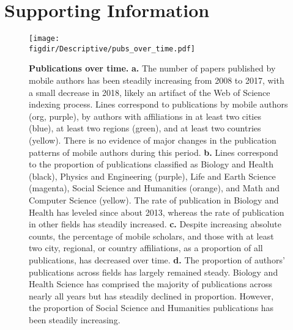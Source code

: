 \documentclass[12pt]{article} %
\def\figdir{../Figs}
\newcommand{\beginsupplement}{%
        \setcounter{table}{0}
        \renewcommand{\thetable}{S\arabic{table}}%
        \setcounter{figure}{0}
        \renewcommand{\thefigure}{S\arabic{figure}}%
     }
\begin{document}
\newpage
\clearpage
\beginsupplement
\section{Supporting Information}



%
%
\begin{figure}[p!]
    \centering
    \label{fig:supp:pubs_over_time}
    \texttt{[image: \\figdir/Descriptive/pubs\_over\_time.pdf]}
    \caption{
        \textbf{Publications over time.}
        \textbf{a.}
        The number of papers published by mobile authors has been steadily increasing from 2008 to 2017, with a small decrease in 2018,  likely an artifact of the Web of Science indexing process.
        Lines correspond to publications by mobile authors (org, purple), by authors with affiliations in at least two cities (blue), at least two regions (green), and at least two countries (yellow).
        There is no evidence of major changes in the publication patterns of mobile authors during this period. 
        \textbf{b.}
        Lines correspond to the proportion of publications classified as Biology and Health (black), Physics and Engineering (purple), Life and Earth Science (magenta), Social Science and Humanities (orange), and Math and Computer Science (yellow).
        The rate of publication in Biology and Health has leveled since about 2013, whereas the rate of publication in other fields has steadily increased. 
        \textbf{c.} 
        Despite increasing absolute counts, the percentage of mobile scholars, and those with at least two city, regional, or country affiliations, as a proportion of all publications, has decreased over time. 
        \textbf{d.} 
        The proportion of authors' publications across fields has largely remained steady.
        Biology and Health Science has comprised the majority of publications across nearly all years but has steadily declined in proportion. 
        However, the proportion of Social Science and Humanities publications has been steadily increasing. 
    }
\end{figure}
\end{document}

